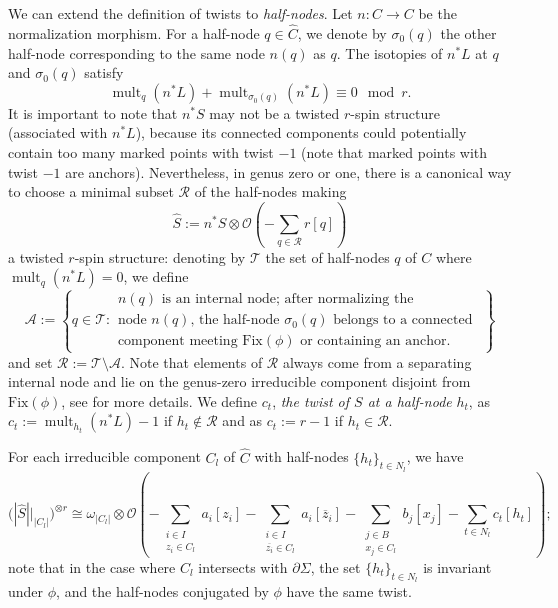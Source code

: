 \documentclass[11pt]{amsart}
\theoremstyle{definition}
\theoremstyle{remark}
\newcommand{\<}{\left<}
\renewcommand{\>}{\right>}
\numberwithin{equation}{section}
\begin{document}
We can extend the definition of twists to \textit{half-nodes}. Let $n: \widehat{C} \to C$ be the normalization morphism. For a half-node $q\in \widehat{C}$, we denote by $\sigma_0(q)$ the other half-node corresponding to the same node $n(q)$ as $q$. The isotopies of $n^*L$ at $q$ and $\sigma_0(q)$ satisfy $$\operatorname{mult}_{q}(n^*L)+\operatorname{mult}_{\sigma_0(q)}(n^*L)\equiv0 \mod r.$$ It is important to note that $n^*S$ may not be a twisted $r$-spin structure (associated with $n^*L$), because its connected components could potentially contain too many marked points with twist $-1$ (note that marked points with twist $-1$ are anchors).  Nevertheless, in genus zero or one, there is a canonical way to choose a minimal subset $\mathcal{R}$ of the half-nodes making
\begin{equation}
\label{eq normalize S}
\widehat{S}:= n^* S \otimes {\mathcal{O}}\left(-\sum_{q \in \mathcal{R}} r [q]\right)
\end{equation}
a twisted $r$-spin structure: denoting by $\mathcal T$ the set of half-nodes $q$ of $C$ where $\operatorname{mult}_{q}(n^*L)=0$, we define
\begin{equation*}
\mathcal A:= \left\{q \in \mathcal T\colon 
\begin{array}{ccc}
    \text{$n(q)$ is an internal node; after normalizing the }\\
    \text{node $n(q)$, the half-node $\sigma_0(q)$ belongs to a connected }\\
    \text{component meeting $\text{Fix}(\phi)$ or containing an anchor.}
\end{array} \right\}
\end{equation*}
and set $\mathcal R := \mathcal T \setminus \mathcal A$. Note that elements of $\mathcal R$ always come from a separating internal node and lie on the genus-zero irreducible component disjoint from $\text{Fix}(\phi)$, see \cite[\S 2.3]{BCT1} for more details. 
We define $c_t$, \textit{the twist of $S$ at a half-node} $h_t$, as $c_t:=\operatorname{mult}_{h_t}(n^*L)-1$ if $h_t \notin \mathcal R$ and as $c_t:=r-1$ if $h_t\in \mathcal R$.

For each irreducible component $C_l$ of $\widehat{C}$ with half-nodes $\{h_t\}_{t \in N_l}$, we have
$$\bigg(|\widehat{S}|\big|_{|C_l|}\bigg)^{\otimes r} \cong \omega_{|C_l|} \otimes {\mathcal{O}}\left(-\sum_{\substack{i \in I\\z_i\in C_l}} a_i[z_i] - \sum_{\substack{i \in I\\ \overline{z_i}\in C_l}} a_i [\overline{z}_i] - \sum_{\substack{j \in B\\ x_j\in C_l}} b_j[x_j] - \sum_{t \in N_l} c_t [h_t]\right);$$
note that in the case where $C_l$ intersects with $\partial \Sigma$, the set $\{h_t\}_{t \in N_l}$ is invariant under $\phi$, and the half-nodes conjugated by $\phi$ have the same twist.
\end{document}
